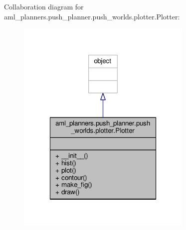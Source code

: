 Collaboration diagram for aml\-\_\-planners.\-push\-\_\-planner.\-push\-\_\-worlds.\-plotter.\-Plotter\-:
\nopagebreak
\begin{figure}[H]
\begin{center}
\leavevmode
\includegraphics[width=238pt]{classaml__planners_1_1push__planner_1_1push__worlds_1_1plotter_1_1_plotter__coll__graph}
\end{center}
\end{figure}
